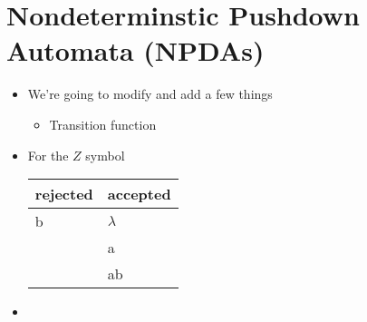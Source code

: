 \documentclass[12pt]{article}
\begin{document}
\section{Nondeterminstic Pushdown Automata (NPDAs)}
\begin{itemize}
    \item We're going to modify and add a few things
    \begin{itemize}
        \item Transition function
    \end{itemize}

    \item For the $Z$ symbol

    \begin{tabular}{l|l}
        \hline
        \textbf{rejected} & \textbf{accepted} \\ \hline
        b   & $\lambda$ \\
            & a         \\
            & ab        \\ \hline
    \end{tabular}

    \item 
\end{itemize}
\end{document}
